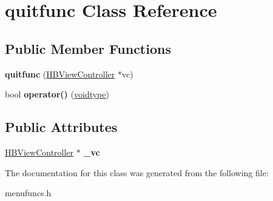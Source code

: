 \hypertarget{classquitfunc}{\section{quitfunc Class Reference}
\label{classquitfunc}
}
\subsection*{Public Member Functions}
\begin{DoxyCompactItemize}
\item 
\hypertarget{classquitfunc_a92ee5f3eaa036a45ff2e1efe731ed0fe}{{\bfseries quitfunc} (\hyperlink{class_h_b_view_controller}{H\-B\-View\-Controller} $\ast$vc)}\label{classquitfunc_a92ee5f3eaa036a45ff2e1efe731ed0fe}

\item 
\hypertarget{classquitfunc_af8642bda915f28bcbfff712ddaa8c519}{bool {\bfseries operator()} (\hyperlink{structvoidtype}{voidtype})}\label{classquitfunc_af8642bda915f28bcbfff712ddaa8c519}

\end{DoxyCompactItemize}
\subsection*{Public Attributes}
\begin{DoxyCompactItemize}
\item 
\hypertarget{classquitfunc_a1bd7c289906407c0015772194704ab1b}{\hyperlink{class_h_b_view_controller}{H\-B\-View\-Controller} $\ast$ {\bfseries \-\_\-vc}}\label{classquitfunc_a1bd7c289906407c0015772194704ab1b}

\end{DoxyCompactItemize}


The documentation for this class was generated from the following file\-:\begin{DoxyCompactItemize}
\item 
menufuncs.\-h\end{DoxyCompactItemize}
